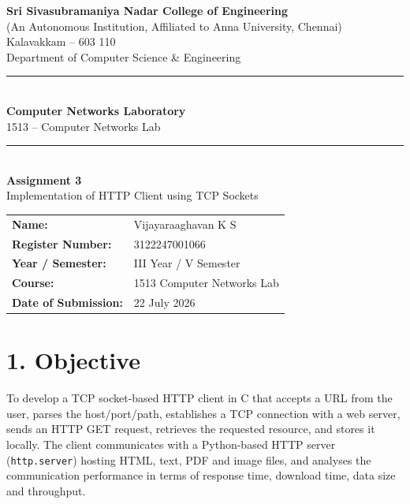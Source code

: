 \documentclass[11pt]{article}
\title{\vspace{-2cm}}
\date{}
\begin{document}
\begin{titlepage}
\centering
\vspace*{1cm}
{\large \textbf{Sri Sivasubramaniya Nadar College of Engineering}}\\
{\small (An Autonomous Institution, Affiliated to Anna University, Chennai)}\\
{\small Kalavakkam -- 603 110}\\[0.3cm]
{\small Department of Computer Science \& Engineering}\\[1.5cm]

\rule{\linewidth}{0.5mm}\\[0.4cm]
{\LARGE \textbf{Computer Networks Laboratory}}\\[0.3cm]
{\Large 1513 -- Computer Networks Lab}\\[0.4cm]
\rule{\linewidth}{0.5mm}\\[1.5cm]

{\huge \textbf{Assignment 3}}\\[0.4cm]
{\Large Implementation of HTTP Client using TCP Sockets}\\[2cm]

\begin{center}
\begin{tabular}{ll}
\textbf{Name:} & Vijayaraaghavan K S \\[0.2cm]
\textbf{Register Number:} & 3122247001066 \\[0.2cm]
\textbf{Year / Semester:} & III Year / V Semester \\[0.2cm]
\textbf{Course:} & 1513 Computer Networks Lab \\[0.2cm]
\textbf{Date of Submission:} & 22 July 2026 \\[0.2cm]
\end{tabular}
\end{center}

\vfill
\end{titlepage}

\section*{1. Objective}
To develop a TCP socket-based HTTP client in C that accepts a URL from the user, parses the
host/port/path, establishes a TCP connection with a web server, sends an HTTP GET request,
retrieves the requested resource, and stores it locally. The client communicates with a
Python-based HTTP server (\texttt{http.server}) hosting HTML, text, PDF and image files, and
analyses the communication performance in terms of response time, download time, data size and
throughput.
\end{document}
